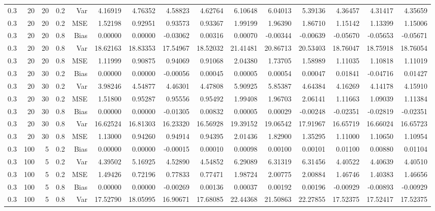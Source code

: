 \begin{table}[!htbp]
\begin{tabular}{lrrrrrrrrrrrrrr}
0.3 &  20 & 20 & 0.2 & Var & 4.16919 & 4.76352 & 4.58823 & 4.62764 & 6.10648 & 6.04013 & 5.39136 & 4.36457 & 4.31417 & 4.35659 \\
0.3 &  20 & 20 & 0.2 & MSE & 1.52198 & 0.92951 & 0.93573 & 0.93367 & 1.99199 & 1.96390 & 1.86710 & 1.15142 & 1.13399 & 1.15006 \\
0.3 &  20 & 20 & 0.8 & Bias & 0.00000 & 0.00000 & -0.03062 & 0.00316 & 0.00070 & -0.00344 & -0.00639 & -0.05670 & -0.05653 & -0.05671 \\
0.3 &  20 & 20 & 0.8 & Var & 18.62163 & 18.83353 & 17.54967 & 18.52032 & 21.41481 & 20.86713 & 20.53403 & 18.76047 & 18.75918 & 18.76054 \\
0.3 &  20 & 20 & 0.8 & MSE & 1.11999 & 0.90875 & 0.94069 & 0.91068 & 2.04380 & 1.73705 & 1.58989 & 1.11035 & 1.10818 & 1.11019 \\
0.3 &  20 & 30 & 0.2 & Bias & 0.00000 & 0.00000 & -0.00056 & 0.00045 & 0.00005 & 0.00054 & 0.00047 & 0.01841 & -0.04716 & 0.01427 \\
0.3 &  20 & 30 & 0.2 & Var & 3.98246 & 4.54877 & 4.46301 & 4.47808 & 5.90925 & 5.85387 & 4.64384 & 4.16269 & 4.14178 & 4.15910 \\
0.3 &  20 & 30 & 0.2 & MSE & 1.51800 & 0.95287 & 0.95556 & 0.95492 & 1.99408 & 1.96703 & 2.06141 & 1.11663 & 1.09039 & 1.11384 \\
0.3 &  20 & 30 & 0.8 & Bias & 0.00000 & 0.00000 & -0.01305 & 0.00832 & 0.00005 & 0.00029 & -0.00248 & -0.02351 & -0.02819 & -0.02351 \\
0.3 &  20 & 30 & 0.8 & Var & 16.62524 & 16.81303 & 16.23320 & 16.56928 & 19.39152 & 19.06542 & 17.91967 & 16.65719 & 16.66024 & 16.65723 \\
0.3 &  20 & 30 & 0.8 & MSE & 1.13000 & 0.94260 & 0.94914 & 0.94395 & 2.01436 & 1.82900 & 1.35295 & 1.11000 & 1.10650 & 1.10954 \\
0.3 & 100 &  5 & 0.2 & Bias & 0.00000 & 0.00000 & -0.00015 & 0.00010 & 0.00098 & 0.00100 & 0.00101 & 0.01100 & 0.00880 & 0.01104 \\
0.3 & 100 &  5 & 0.2 & Var & 4.39502 & 5.16925 & 4.52890 & 4.54852 & 6.29089 & 6.31319 & 6.31456 & 4.40522 & 4.40639 & 4.40510 \\
0.3 & 100 &  5 & 0.2 & MSE & 1.49426 & 0.72196 & 0.77833 & 0.77471 & 1.98724 & 2.00775 & 2.00884 & 1.46746 & 1.40383 & 1.46656 \\
0.3 & 100 &  5 & 0.8 & Bias & 0.00000 & 0.00000 & -0.00269 & 0.00136 & 0.00037 & 0.00192 & 0.00196 & -0.00929 & -0.00893 & -0.00929 \\
0.3 & 100 &  5 & 0.8 & Var & 17.52790 & 18.05995 & 16.90671 & 17.68085 & 22.44368 & 21.50863 & 22.27855 & 17.52375 & 17.52417 & 17.52375 \\

\end{tabular}
\end{table}
